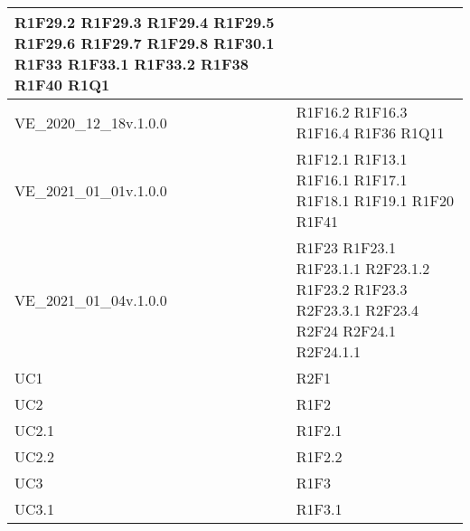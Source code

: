 \begin{center}
\begin{longtable}{|p{44mm}|p{22mm}|}
R1F29.2 \newline
R1F29.3 \newline
R1F29.4 \newline
R1F29.5 \newline
R1F29.6 \newline
R1F29.7 \newline
R1F29.8 \newline
R1F30.1 \newline
R1F33 \newline
R1F33.1 \newline
R1F33.2 \newline
R1F38 \newline
R1F40 \newline
 R1Q1 
\\
\hline
VE\_2020\_12\_18v.1.0.0 &
R1F16.2 \newline
R1F16.3 \newline
R1F16.4 \newline
R1F36 \newline
R1Q11 
\\
\hline
VE\_2021\_01\_01v.1.0.0 &
R1F12.1 \newline
R1F13.1 \newline
R1F16.1 \newline
R1F17.1 \newline
R1F18.1 \newline
R1F19.1 \newline
R1F20 \newline
R1F41 
\\
\hline
VE\_2021\_01\_04v.1.0.0 &
R1F23 \newline
R1F23.1 \newline
R1F23.1.1 \newline
R2F23.1.2 \newline
R1F23.2 \newline
R1F23.3 \newline
R2F23.3.1 \newline
R2F23.4 \newline
R2F24 \newline
R2F24.1 \newline
R2F24.1.1 
\\
\hline
UC1 &
 R2F1 
\\
\hline
UC2 &
R1F2 
\\
\hline
UC2.1 &
R1F2.1 
\\
\hline
UC2.2 &
R1F2.2 
\\
\hline
UC3 &
R1F3 
\\
\hline
UC3.1 &
R1F3.1 
\\

\end{longtable}
\end{center}

